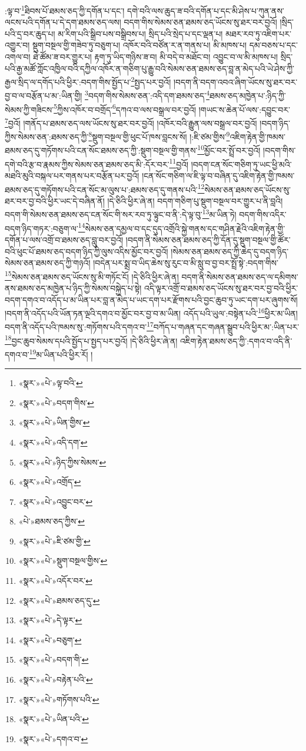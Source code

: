 :ལྟ་བ་\footnote{«སྣར་»«པེ་»ལྟ་བའི་}ཐིབས་པོ་ཐམས་ཅད་ཀྱི་དགོན་པ་དང་། དགེ་བའི་ལས་ཆུད་ཟ་བའི་དགོན་པ་དང་མི་ཤེས་པ་ཀུན་ནས་ལངས་པའི་དགོན་པ་དེ་དག་ཐམས་ཅད་ལས། བདག་གིས་སེམས་ཅན་ཐམས་ཅད་ཡོངས་སུ་ཐར་བར་བྱའོ། །སྲིད་པའི་དྲ་བར་ཆུད་པ། མ་རིག་པའི་སྒྲིབ་པས་བསྒྲིབས་པ། སྲིད་པའི་སྲེད་པ་དང་ལྡན་པ། མཐར་རབ་ཏུ་འཇིག་པར་འགྱུར་བ། སྡུག་བསྔལ་གྱི་གཟེབ་ཏུ་བཅུག་པ། འཁོར་བའི་བཙོན་ར་ན་གནས་པ། མི་མཁས་པ། དམ་བཅས་པ་དང་འགལ་བ། ཐེ་ཚོམ་ཟ་བར་གྱུར་པ། རྟག་ཏུ་ཡིད་གཉིས་ཟ་བ། མི་བདེ་བ་མཐོང་བ། འབྱུང་བ་ལ་མི་མཁས་པ། སྲིད་པའི་རྒྱ་མཚོ་ཀློང་འཁྱིལ་བའི་དཀྱིལ་འཁོར་ན་གཅིག་པུ་རྒྱུ་བའི་སེམས་ཅན་ཐམས་ཅད་བླ་ན་མེད་པའི་ཡེ་ཤེས་ཀྱི་རྒྱལ་སྲིད་ལ་དགོད་པའི་ཕྱིར་:བདག་གིས་སྤྱོད་པ་\footnote{«སྣར་»«པེ་»བདག་གིས་}སྤྱད་པར་བྱའོ། །བདག་ནི་བདག་འབའ་ཞིག་ཡོངས་སུ་ཐར་བར་བྱ་བ་ལ་བརྩོན་པ་མ་:ཡིན་གྱི། \footnote{«སྣར་»«པེ་»ཡིན་གྱིས་}བདག་གིས་སེམས་ཅན་:འདི་དག་ཐམས་ཅད་\footnote{«སྣར་»«པེ་»འདི་དག་}ཐམས་ཅད་མཁྱེན་པ་:ཉིད་ཀྱི་སེམས་ཀྱི་གཟིངས་\footnote{«སྣར་»«པེ་»ཉིད་ཀྱིས་སེམས་}ཀྱིས་འཁོར་བ་བགྲོད་\footnote{«སྣར་»«པེ་»འགྲོད་}དཀའ་བ་ལས་བསྒྲལ་བར་བྱའོ། །གཡང་ས་ཆེན་པོ་ལས་:དབྱུང་བར་\footnote{«སྣར་»«པེ་»འབྱུང་བར་}བྱའོ། །གནོད་པ་ཐམས་ཅད་ལས་ཡོངས་སུ་ཐར་བར་བྱའོ། །འཁོར་བའི་རྒྱུན་ལས་བསྒྲལ་བར་བྱའོ། །བདག་ཉིད་ཀྱིས་སེམས་ཅན་:ཐམས་ཅད་ཀྱི་\footnote{«པེ་»ཐམས་ཅད་ཀྱིས་}སྡུག་བསྔལ་གྱི་ཕུང་པོ་ཁས་བླངས་སོ། །:ཇི་ཙམ་གྱིས་\footnote{«སྣར་»«པེ་»ཇི་ཙམ་གྱི་}འཇིག་རྟེན་གྱི་ཁམས་ཐམས་ཅད་དུ་གཏོགས་པའི་ངན་སོང་ཐམས་ཅད་ཀྱི་:སྡུག་བསྔལ་གྱི་གནས་\footnote{«སྣར་»«པེ་»སྡུག་བསྔལ་གྱིས་}མྱོང་བར་སྤྲོ་བར་བྱའོ། །བདག་གིས་དགེ་བའི་རྩ་བ་རྣམས་ཀྱིས་སེམས་ཅན་ཐམས་ཅད་མི་:དོར་བར་\footnote{«སྣར་»«པེ་»འདོར་བར་}བྱའོ། །བདག་ངན་སོང་གཅིག་ཏུ་ཡང་ཕྱི་མའི་མཐའི་མུའི་བསྐལ་པར་གནས་པར་བརྩོན་པར་བྱའོ། །ངན་སོང་གཅིག་ལ་ཇི་ལྟ་བ་བཞིན་དུ་འཇིག་རྟེན་གྱི་ཁམས་ཐམས་ཅད་དུ་གཏོགས་པའི་ངན་སོང་མ་ལུས་པ་:ཐམས་ཅད་དུ་གནས་པའི་\footnote{«སྣར་»«པེ་»ཐམས་ཅད་དུ་}སེམས་ཅན་ཐམས་ཅད་ཡོངས་སུ་ཐར་བར་བྱ་བའི་ཕྱིར་ཡང་དེ་བཞིན་ནོ། །དེ་ཅིའི་ཕྱིར་ཞེ་ན། བདག་གཅིག་པུ་སྡུག་བསྔལ་བར་གྱུར་པ་ནི་བླའི། བདག་གི་སེམས་ཅན་ཐམས་ཅད་ངན་སོང་གི་སར་རབ་ཏུ་ལྟུང་བ་ནི་:དེ་ལྟ་བུ་\footnote{«སྣར་»«པེ་»དེ་ལྟར་}མ་ཡིན་ཏེ། བདག་གིས་འདིར་བདག་ཉིད་གཏར་:བཅུག་ལ་\footnote{«སྣར་»«པེ་»བཅུག་}སེམས་ཅན་དམྱལ་བ་དང་དུད་འགྲོའི་སྐྱེ་གནས་དང་གཤིན་རྗེའི་འཇིག་རྟེན་གྱི་དགོན་པ་ལས་འགྲོ་བ་ཐམས་ཅད་བླུ་བར་བྱའོ། །བདག་ནི་སེམས་ཅན་ཐམས་ཅད་ཀྱི་དོན་དུ་སྡུག་བསྔལ་གྱི་ཚོར་བའི་ཕུང་པོ་ཐམས་ཅད་བདག་ཉིད་ཀྱི་ལུས་འདིས་མྱོང་བར་བྱའོ། །སེམས་ཅན་ཐམས་ཅད་ཀྱི་ཆེད་དུ་བདག་ཉིད་སེམས་ཅན་ཐམས་ཅད་ཀྱི་གཉའོ། །བདེན་པར་སྨྲ་བ་ཡིད་ཆེས་སུ་རུང་བ་མི་སླུ་བ་བྱ་བར་སྤྲོ་སྟེ་:བདག་གིས་\footnote{«སྣར་»«པེ་»བདག་གི་}སེམས་ཅན་ཐམས་ཅད་ཡོངས་སུ་མི་གཏོང་ངོ། །དེ་ཅིའི་ཕྱིར་ཞེ་ན། བདག་ནི་སེམས་ཅན་ཐམས་ཅད་ལ་དམིགས་ནས་ཐམས་ཅད་མཁྱེན་པ་ཉིད་ཀྱི་སེམས་བསྐྱེད་པ་སྟེ། འདི་ལྟར་འགྲོ་བ་ཐམས་ཅད་ཡོངས་སུ་ཐར་བར་བྱ་བའི་ཕྱིར་བདག་དགའ་བ་འདོད་པ་མ་ཡིན་པར་བླ་ན་མེད་པ་ཡང་དག་པར་རྫོགས་པའི་བྱང་ཆུབ་ཏུ་ཡང་དག་པར་ཞུགས་སོ། །བདག་ནི་འདོད་པའི་ཡོན་ཏན་ལྔའི་དགའ་བ་མྱོང་བར་བྱ་བ་མ་ཡིན། འདོད་པའི་ཡུལ་:བསྟེན་པའི་\footnote{«སྣར་»«པེ་»བརྟེན་པའི་}ཕྱིར་མ་ཡིན། བདག་ནི་འདོད་པའི་ཁམས་སུ་:གཏོགས་པའི་དགའ་བ་\footnote{«སྣར་»«པེ་»གཏོགས་པའི་}བཀོད་པ་གཞན་དང་གཞན་སྒྲུབ་པའི་ཕྱིར་མ་:ཡིན་པར་\footnote{«སྣར་»«པེ་»ཡིན་པའི་}བྱང་ཆུབ་སེམས་དཔའི་སྤྱོད་པ་སྤྱད་པར་བྱའོ། །དེ་ཅིའི་ཕྱིར་ཞེ་ན། འཇིག་རྟེན་ཐམས་ཅད་ཀྱི་:དགའ་བ་འདི་ནི་དགའ་བ་\footnote{«སྣར་»«པེ་»དགའ་བ་}མ་ཡིན་པའི་ཕྱིར་རོ། །
